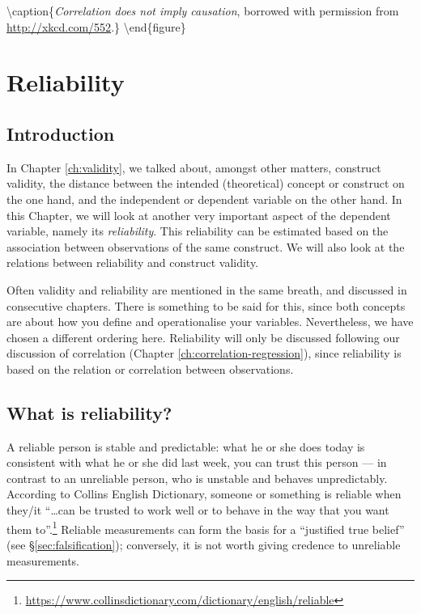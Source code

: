 \documentclass[
]{book}
\begin{document}
\textbackslash caption\{\emph{Correlation does not imply causation}, borrowed with permission from \url{http://xkcd.com/552}.\}\label{fig:xkcd552}
\textbackslash end\{figure\}

\hypertarget{ch:reliability}{%
\chapter{Reliability}\label{ch:reliability}}

\hypertarget{introduction-6}{%
\section{Introduction}\label{introduction-6}}

In Chapter \ref{ch:validity}, we talked about, amongst other matters,
construct validity, the distance between the intended (theoretical)
concept or construct on the one hand, and the independent or dependent variable
on the other hand. In this Chapter, we will look at another very important
aspect of the dependent variable, namely its \emph{reliability}.
This reliability can be estimated based on the
association between observations of the same construct.
We will also look at the relations between reliability and construct validity.

Often validity and reliability are mentioned in the same breath, and discussed in consecutive
chapters. There is something to be said for this, since both concepts are about how you define and
operationalise your variables. Nevertheless, we have chosen a different ordering here. Reliability
will only be discussed following our discussion of correlation (Chapter
\ref{ch:correlation-regression}), since reliability is based on the relation or correlation
between observations.

\hypertarget{what-is-reliability}{%
\section{What is reliability?}\label{what-is-reliability}}

A reliable person is stable and predictable: what he or she does
today is consistent with what he or she did last week, you can trust
this person --- in contrast to an unreliable person, who
is unstable and behaves unpredictably. According to Collins English Dictionary, someone or something is reliable when they/it ``\ldots can be trusted to work well or to behave in the way that you want them to''.\footnote{\url{https://www.collinsdictionary.com/dictionary/english/reliable}}
Reliable measurements can form the basis for a
``justified true belief'' (see
§\ref{sec:falsification}); conversely, it is not worth
giving credence to unreliable measurements.
\end{document}
